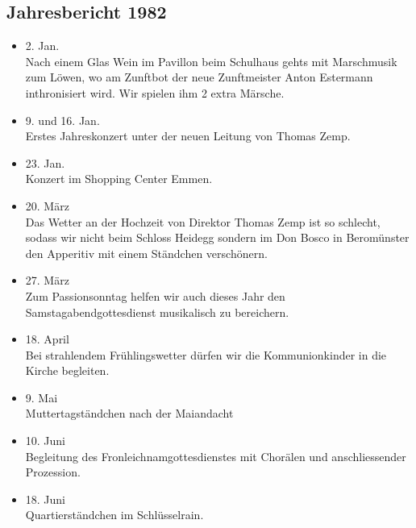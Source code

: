 \subsection{Jahresbericht 1982}

\begin{history}


    \begin{itemize}

        \item[]2. Jan.\\
        Nach einem Glas Wein im Pavillon beim Schulhaus gehts mit Marschmusik
        zum Löwen, wo am Zunftbot der neue Zunftmeister Anton Estermann
        inthronisiert wird. Wir spielen ihm 2 extra Märsche.

        \item[]9. und 16. Jan.\\
        Erstes Jahreskonzert unter der neuen Leitung von Thomas Zemp.

        \item[]23. Jan.\\
        Konzert im Shopping Center Emmen.

        \item[]20. März\\
        Das Wetter an der Hochzeit von Direktor Thomas Zemp ist so schlecht,
        sodass wir nicht beim Schloss Heidegg sondern im Don Bosco in
        Beromünster den Apperitiv mit einem Ständchen verschönern.

        \item[]27. März\\
        Zum Passionsonntag helfen wir auch dieses Jahr den
        Samstagabendgottesdienst musikalisch zu bereichern.

        \item[]18. April\\
        Bei strahlendem Frühlingswetter dürfen wir die Kommunionkinder in die
        Kirche begleiten.

        \item[]9. Mai\\
        Muttertagständchen nach der Maiandacht

        \item[]10. Juni\\
        Begleitung des Fronleichnamgottesdienstes mit Chorälen und
        anschliessender Prozession.

        \item[]18. Juni\\
        Quartierständchen im Schlüsselrain.


\end{itemize}
\end{history}

